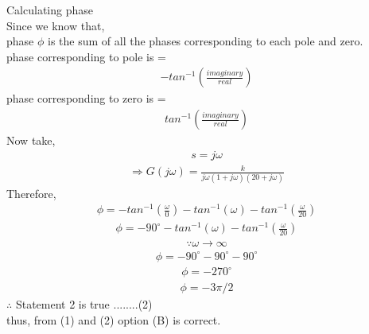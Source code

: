 Calculating phase\\
Since we know that,\\
phase $ \phi $ is the sum of all the phases corresponding to each pole and zero.\\
phase corresponding to pole is =  
\begin{align}
-tan^{-1}( \frac{imaginary}{real})
\end{align} 
phase corresponding to zero is =
\begin{align}
 tan^{-1}( \frac{imaginary}{real})
 \end{align} 
Now take,
\begin{align}
 s = j\omega
  \end{align} 
  \begin{align}
 \Rightarrow  G(j\omega) =  \frac{k}{j\omega(1+j\omega)(20+j\omega)}
 \end{align} 
Therefore, 
\begin{align}
 \phi =  -tan^{-1}( {\frac{\omega}{0}}) - tan^{-1}(\omega) - tan^{-1}( \frac{\omega}{20})
 \end{align} 
 \begin{align}
  \phi =  - 90^\circ - tan^{-1}(\omega) - tan^{-1}( \frac{\omega}{20})
  \end{align} 
  \begin{align}
  \because \omega \to \infty
 \end{align} 
 \begin{align}
   \phi =   - 90^\circ - 90^\circ - 90^\circ
   \end{align} 
   \begin{align}
 \phi = -270^\circ
 \end{align} 
 \begin{align}
 \phi = -3\pi/2 
 \end{align} 
 $\therefore$ Statement 2 is true ........(2)\\
 thus, from (1) and (2) option (B) is correct.
 